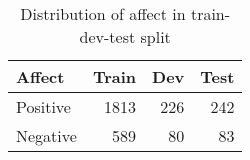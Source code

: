 \begin{table}[t]
	\centering
	\begin{tabular}{lrrr}
		\toprule
		\textbf{Affect} & \textbf{Train} & \textbf{Dev} & \textbf{Test} \\ \midrule
		Positive & 1813 & 226 & 242\\
        Negative & 589 & 80 & 83\\
        \bottomrule
	\end{tabular}
	\caption{Distribution of affect in train-dev-test split}
	\label{tab:traindevtestsplit}
\end{table}
